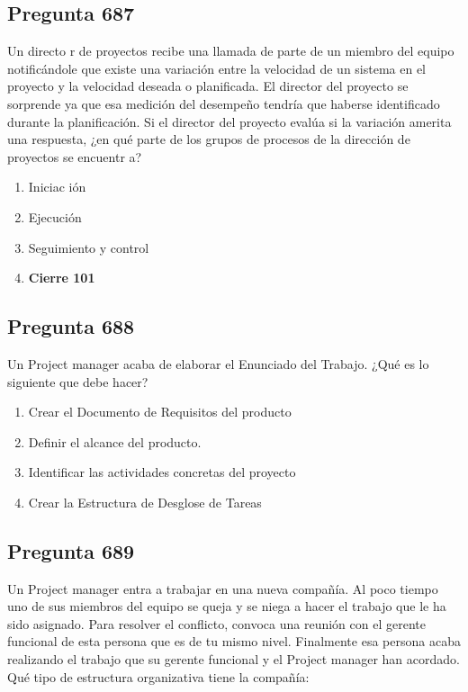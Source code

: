\documentclass[11pt,a4paper]{article}
\begin{document}
\subsection*{Pregunta 687}
Un directo r de proyectos recibe una llamada de parte de un miembro del equipo notificándole que existe una variación entre la velocidad de un sistema en el proyecto y la velocidad deseada o planificada. El director del proyecto se sorprende ya que esa medición del desempeño tendría que haberse identificado durante la planificación. Si el director del proyecto evalúa si la variación amerita una respuesta, ¿en qué parte de los grupos de procesos de la dirección de proyectos se encuentr a?

\begin{enumerate}[label=\alph*)]
  \item Iniciac ión
  \item Ejecución
  \item Seguimiento y control
  \item \textbf{Cierre 101}
\end{enumerate}

\subsection*{Pregunta 688}
Un Project manager acaba de elaborar el Enunciado del Trabajo. ¿Qué es lo siguiente que debe hacer?

\begin{enumerate}[label=\alph*)]
  \item Crear el Documento de Requisitos del producto
  \item Definir el alcance del producto.
  \item Identificar las actividades concretas del proyecto
  \item Crear la Estructura de Desglose de Tareas
\end{enumerate}

\subsection*{Pregunta 689}
Un Project manager entra a trabajar en una nueva compañía. Al poco tiempo uno de sus miembros del equipo se queja y se niega a hacer el trabajo que le ha sido asignado. Para resolver el conflicto, convoca una reunión con el gerente funcional de esta persona que es de tu mismo nivel. Finalmente esa persona acaba realizando el trabajo que su gerente funcional y el Project manager han acordado. Qué tipo de estructura organizativa tiene la compañía:
\end{document}

